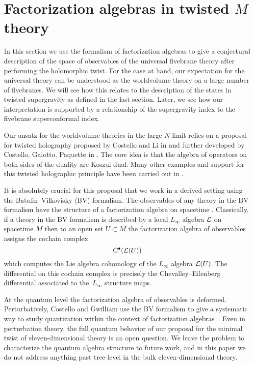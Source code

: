 %
%
%

\section{Factorization algebras in twisted $M$ theory}
\label{s:fact}

In this section we use the formalism of factorization algebras to give a conjectural description of the space of observables of the universal fivebrane theory after performing the holomorphic twist.
For the case at hand, our expectation for the universal theory can be understood as the worldvolume theory on a large number of fivebranes. 
We will see how this relates to the description of the states in twisted supergravity as defined in the last section.
Later, we see how our interpretation is supported by a relationship of the supergravity index to the fivebrane superconformal index.

Our ansatz for the worldvolume theories in the large $N$ limit relies on a proposal for twisted holography proposed by Costello and Li in \cite{CLsugra} and further developed by Costello, Gaiotto, Paquette in \cite{CostelloM2,CostelloM5,costello2021twisted,CP}.
The core idea is that the algebra of operators on both sides of the duality are Koszul dual. 
Many other examples and support for this twisted holographic principle have been carried out in \cite{Oh:2021wes,Oh:2020hph,Gaiotto:2021xce}.

It is absolutely crucial for this proposal that we work in a derived setting using the Batalin--Vilkovisky (BV) formalism. 
The observables of any theory in the BV formalism have the structure of a factorization algebra on spacetime \cite{CG2}. 
Classically, if a theory in the BV formalism is described by a local $L_\infty$ algebra $\mathcal L$ on spacetime $M$ then to an open set $U \subset M$ the factorization algebra of observables assigns the cochain complex
\[
{\rm C}^\bullet(\mathcal L(U))
\]
which computes the Lie algebra cohomology of the $L_\infty$ algebra $\mathcal L(U)$. 
The differential on this cochain complex is precisely the Chevalley--Eilenberg differential associated to the~$L_\infty$ structure maps. 

At the quantum level the factorization algebra of observables is deformed.
Perturbatively, Costello and Gwilliam use the BV formalism to give a systematic way to study quantization within the context of factorization algebras~\cite{CG2}. 
Even in perturbation theory, the full quantum behavior of our proposal for the minimal twist of eleven-dimensional theory is an open question. 
We leave the problem to characterize the quantum algebra structure to future work, and in this paper we do not address anything past tree-level in the bulk eleven-dimensional theory.


